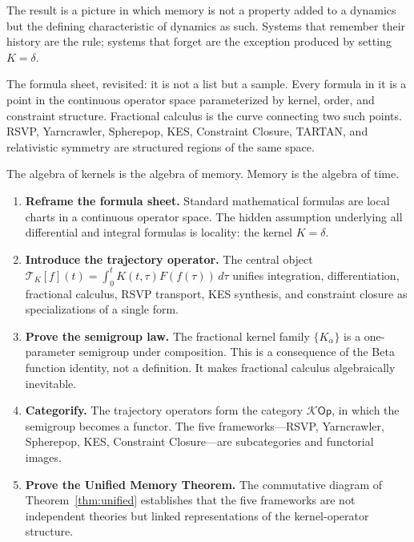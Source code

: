 \documentclass[12pt]{article}
\newcommand{\Kcal}{\mathcal{K}}
\newcommand{\TK}{\mathcal{T}_K}
\begin{document}
The result is a picture in which memory is not a property added to a
dynamics but the defining characteristic of dynamics as such. Systems
that remember their history are the rule; systems that forget are the
exception produced by setting $K = \delta$.

The formula sheet, revisited: it is not a list but a sample. Every
formula in it is a point in the continuous operator space parameterized
by kernel, order, and constraint structure. Fractional calculus is the
curve connecting two such points. RSVP, Yarncrawler, Spherepop, KES,
Constraint Closure, TARTAN, and relativistic symmetry are structured
regions of the same space.

The algebra of kernels is the algebra of memory. Memory is the algebra
of time.

\begin{enumerate}
  \item \textbf{Reframe the formula sheet.} Standard mathematical formulas
    are local charts in a continuous operator space. The hidden assumption
    underlying all differential and integral formulas is locality: the
    kernel $K = \delta$.

  \item \textbf{Introduce the trajectory operator.} The central object
    $\TK[f](t) = \int_0^t K(t,\tau) F(f(\tau))\, d\tau$ unifies
    integration, differentiation, fractional calculus, RSVP transport,
    KES synthesis, and constraint closure as specializations of a single
    form.

  \item \textbf{Prove the semigroup law.} The fractional kernel family
    $\{K_\alpha\}$ is a one-parameter semigroup under composition. This
    is a consequence of the Beta function identity, not a definition.
    It makes fractional calculus algebraically inevitable.

  \item \textbf{Categorify.} The trajectory operators form the category
    $\Kcal\mathsf{Op}$, in which the semigroup becomes a functor. The
    five frameworks---RSVP, Yarncrawler, Spherepop, KES, Constraint
    Closure---are subcategories and functorial images.

  \item \textbf{Prove the Unified Memory Theorem.} The commutative
    diagram of Theorem~\ref{thm:unified} establishes that the five
    frameworks are not independent theories but linked representations
    of the kernel-operator structure.
\end{enumerate}
\end{document}
